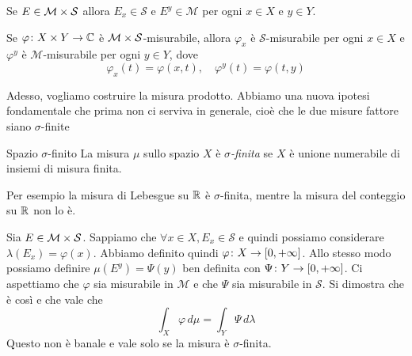 \documentclass[a4paper]{article}
\begin{document}
\begin{radioactive}
\begin{snippettheorem}{}
    Se \(E \in \mathcal M \times \mathcal S\)
    allora \(E_x \in \mathcal S\) e \(E^y \in \mathcal M\)
    per ogni \(x \in X\) e \(y \in Y\).
\end{snippettheorem}
\end{radioactive}

\begin{radioactive}
\begin{snippettheorem}{}
    Se \(\varphi \colon X \times Y \to \mathbb{C}\)
    è \(\mathcal M \times \mathcal S\)-misurabile, allora \(\varphi_x\)
    è \(\mathcal S\)-misurabile per ogni \(x \in X\)
    e \(\varphi^y\) è \(\mathcal M\)-misurabile per ogni \(y \in Y\), dove \[
        \varphi_x(t) = \varphi(x,t), \quad
        \varphi^y(t)=\varphi(t,y)
    \]
\end{snippettheorem}
\end{radioactive}

\begin{radioactive}
Adesso, vogliamo costruire la misura prodotto.
Abbiamo una nuova ipotesi fondamentale che prima non ci serviva in generale,
cioè che le due misure fattore siano \(\sigma\)-finite
\end{radioactive}

\begin{radioactive}
\begin{snippetdefinition}{Spazio \(\sigma\)-finito}
    La misura \(\mu\) sullo spazio \(X\) è \emph{\(\sigma\)-finita}
    se \(X\) è unione numerabile di insiemi di misura finita.
\end{snippetdefinition}
\end{radioactive}

\begin{radioactive}
Per esempio la misura di Lebesgue su \(\mathbb{R}\) è \(\sigma\)-finita,
mentre la misura del conteggio su \(\mathbb{R}\) non lo è.
\end{radioactive}

\begin{radioactive}
Sia \(E \in \mathcal M \times \mathcal S\).
Sappiamo che \(\forall x \in X, E_x \in \mathcal S\)
e quindi possiamo considerare \(\lambda(E_x) = \varphi(x)\).
Abbiamo definito quindi
\(\varphi \colon X \to [0,+\infty]\). Allo stesso modo possiamo definire
\(\mu(E^y) = \Psi(y)\) ben definita con \(\Psi \colon Y \to [0,+\infty]\).
Ci aspettiamo che \(\varphi\) sia misurabile in \(\mathcal M\)
e che \(\Psi\) sia misurabile in \(\mathcal S\).
Si dimostra che è così e che vale che
\[
    \int_X \varphi\,d\mu = \int_Y\Psi\,d\lambda
\]
Questo non è banale e vale solo se la misura è \(\sigma\)-finita.
\end{radioactive}
\end{document}
